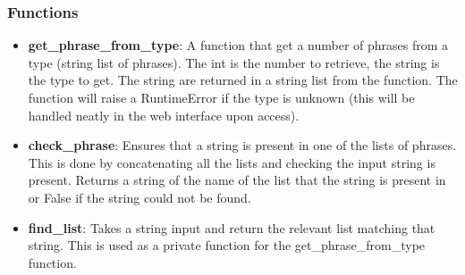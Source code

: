\documentclass{article}
\begin{document}
\subsubsection{Functions}
\begin{itemize}
	
	\item \textbf{get\_phrase\_from\_type}: A function that get a number of phrases from a type (string list of phrases). The int is the number to retrieve, the string is the type to get. The string are returned in a string list from the function. The function will raise a RuntimeError if the type is unknown (this will be handled neatly in the web interface upon access).
	
	\item \textbf{check\_phrase}: Ensures that a string is present in one of the lists of phrases. This is done by concatenating all the lists and checking the input string is present. Returns a string of the name of the list that the string is present in or False if the string could not be found.
	
	\item \textbf{find\_list}: Takes a string input and return the relevant list matching that string. This is used as a private function for the get\_phrase\_from\_type function.
	
\end{itemize}
\end{document}
